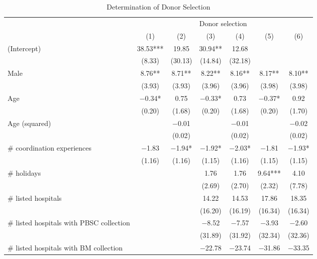 \documentclass[12pt, a4paper]{article}
\begin{document}
\begin{table}[H]

\caption{\label{tab:lm-who-selected}Determination of Donor Selection}
\centering
\fontsize{8}{10}\selectfont
\begin{threeparttable}
\begin{tabular}[t]{lcccccc}
\toprule
\multicolumn{1}{c}{ } & \multicolumn{6}{c}{Donor selection} \\
\cmidrule(l{3pt}r{3pt}){2-7}
  & (1) & (2) & (3) & (4) & (5) & (6)\\
\midrule
(Intercept) & \num{38.53}*** & \num{19.85} & \num{30.94}** & \num{12.68} &  & \\
 & (\num{8.33}) & (\num{30.13}) & (\num{14.84}) & (\num{32.18}) &  & \\
Male & \num{8.76}** & \num{8.71}** & \num{8.22}** & \num{8.16}** & \num{8.17}** & \num{8.10}**\\
 & (\num{3.93}) & (\num{3.93}) & (\num{3.96}) & (\num{3.96}) & (\num{3.98}) & (\num{3.98})\\
Age & \num{-0.34}* & \num{0.75} & \num{-0.33}* & \num{0.73} & \num{-0.37}* & \num{0.92}\\
 & (\num{0.20}) & (\num{1.68}) & (\num{0.20}) & (\num{1.68}) & (\num{0.20}) & (\num{1.70})\\
Age (squared) &  & \num{-0.01} &  & \num{-0.01} &  & \num{-0.02}\\
 &  & (\num{0.02}) &  & (\num{0.02}) &  & (\num{0.02})\\
\# coordination experiences & \num{-1.83} & \num{-1.94}* & \num{-1.92}* & \num{-2.03}* & \num{-1.81} & \num{-1.93}*\\
 & (\num{1.16}) & (\num{1.16}) & (\num{1.15}) & (\num{1.16}) & (\num{1.15}) & (\num{1.15})\\
\# holidays &  &  & \num{1.76} & \num{1.76} & \num{9.64}*** & \num{4.10}\\
 &  &  & (\num{2.69}) & (\num{2.70}) & (\num{2.32}) & (\num{7.78})\\
\# listed hospitals &  &  & \num{14.22} & \num{14.53} & \num{17.86} & \num{18.35}\\
 &  &  & (\num{16.20}) & (\num{16.19}) & (\num{16.34}) & (\num{16.34})\\
\# listed hospitals with PBSC collection &  &  & \num{-8.52} & \num{-7.57} & \num{-3.93} & \num{-2.60}\\
 &  &  & (\num{31.89}) & (\num{31.92}) & (\num{32.34}) & (\num{32.36})\\
\# listed hospitals with BM collection &  &  & \num{-22.78} & \num{-23.74} & \num{-31.86} & \num{-33.35}\\

\end{tabular}
\end{threeparttable}
\end{table}
\end{document}
